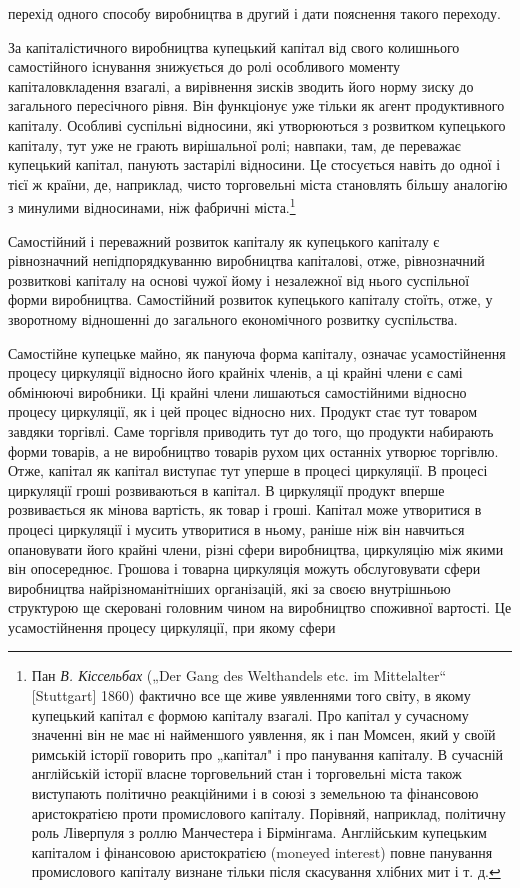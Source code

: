 \parcont{}  %
перехід одного способу виробництва в другий і дати пояснення
такого переходу.

За капіталістичного виробництва купецький капітал від свого
колишнього самостійного існування знижується до ролі особливого
моменту капіталовкладення взагалі, а вирівнення зисків
зводить його норму зиску до загального пересічного рівня. Він
функціонує уже тільки як агент продуктивного капіталу. Особливі
суспільні відносини, які утворюються з розвитком купецького
капіталу, тут уже не грають вирішальної ролі; навпаки, там,
де переважає купецький капітал, панують застарілі відносини.
Це стосується навіть до одної і тієї ж країни, де, наприклад,
чисто торговельні міста становлять більшу аналогію з минулими
відносинами, ніж фабричні міста.\footnote{
Пан \emph{В. Кіссельбах} („Der Gang des Welthandels etc. im Mittelalter“ [Stuttgart]
1860) фактично все ще живе уявленнями того світу, в якому купецький
капітал є формою капіталу взагалі. Про капітал у сучасному значенні він не
має ні найменшого уявлення, як і пан Момсен, який у своїй римській історії
говорить про „капітал" і про панування капіталу. В сучасній англійській історії
власне торговельний стан і торговельні міста також виступають політично
реакційними і в союзі з земельною та фінансовою аристократією проти промислового
капіталу. Порівняй, наприклад, політичну роль Ліверпуля з роллю Манчестера
і Бірмінгама. Англійським купецьким капіталом і фінансовою аристократією
(moneyed interest) повне панування промислового капіталу визнане
тільки після скасування хлібних мит і т. д.
}

Самостійний і переважний розвиток капіталу як купецького
капіталу є рівнозначний непідпорядкуванню виробництва капіталові,
отже, рівнозначний розвиткові капіталу на основі чужої
йому і незалежної від нього суспільної форми виробництва. Самостійний
розвиток купецького капіталу стоїть, отже, у зворотному
відношенні до загального економічного розвитку суспільства.

Самостійне купецьке майно, як пануюча форма капіталу,
означає усамостійнення процесу циркуляції відносно його крайніх
членів, а ці крайні члени є самі обмінюючі виробники. Ці крайні
члени лишаються самостійними відносно процесу циркуляції, як
і цей процес відносно них. Продукт стає тут товаром завдяки
торгівлі. Саме торгівля приводить тут до того, що продукти
набирають форми товарів, а не виробництво товарів рухом цих
останніх утворює торгівлю. Отже, капітал як капітал виступає тут
уперше в процесі циркуляції. В процесі циркуляції гроші розвиваються
в капітал. В циркуляції продукт вперше розвивається
як мінова вартість, як товар і гроші. Капітал може утворитися
в процесі циркуляції і мусить утворитися в ньому, раніше ніж
він навчиться опановувати його крайні члени, різні сфери виробництва,
циркуляцію між якими він опосереднює. Грошова і товарна
циркуляція можуть обслуговувати сфери виробництва найрізноманітніших
організацій, які за своєю внутрішньою структурою
ще скеровані головним чином на виробництво споживної
вартості. Це усамостійнення процесу циркуляції, при якому сфери
\parbreak{}  %
